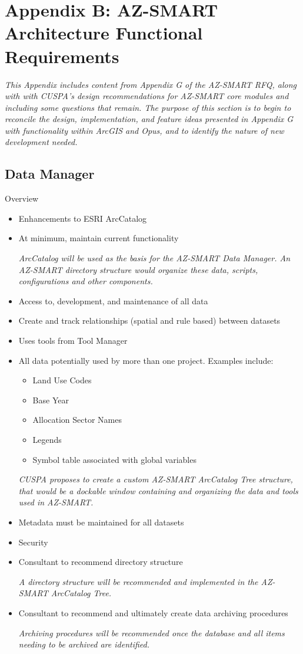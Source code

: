 \section{Appendix B: AZ-SMART Architecture Functional Requirements}
\emph{This Appendix includes content from Appendix G of the AZ-SMART RFQ, along with with CUSPA's design recommendations for AZ-SMART core modules and including some questions that remain.  The purpose of this section is to begin to reconcile the design, implementation, and feature ideas presented in Appendix G with functionality within ArcGIS and Opus, and to identify the nature of new development needed.}

\subsection{Data Manager}
Overview
\begin{itemize}
\item Enhancements to ESRI ArcCatalog
\item At minimum, maintain current functionality

\emph{ArcCatalog will be used as the basis for the AZ-SMART Data Manager.  An AZ-SMART directory structure would organize these data, scripts, configurations and other components.}

\item Access to, development, and maintenance of all data
\item Create and track relationships (spatial and rule based) between datasets
\item Uses tools from Tool Manager
\item All data potentially used by more than one project. Examples include:
\begin{itemize}
\item Land Use Codes
\item Base Year
\item Allocation Sector Names
\item Legends
\item Symbol table associated with global variables
\end{itemize}

\emph{CUSPA proposes to create a custom AZ-SMART ArcCatalog Tree structure, that would be a dockable window containing and organizing the data and tools used in AZ-SMART.}


\item Metadata must be maintained for all datasets

\item Security

\item Consultant to recommend directory structure

\emph{A directory structure will be recommended and implemented in the AZ-SMART ArcCatalog Tree.}

\item Consultant to recommend and ultimately create data archiving procedures

\emph{Archiving procedures will be recommended once the database and all items needing to be archived are identified.}

\end{itemize}


